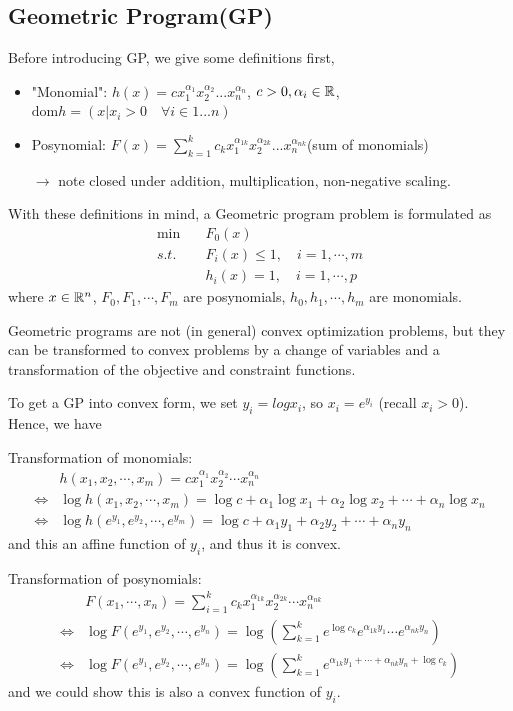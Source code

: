 \subsection{Geometric Program(GP)}
Before introducing GP, we give some definitions first,
\begin{itemize}
	\item "Monomial": $h(x) = cx_1^{\alpha_1}x_2^{\alpha_2}...x_n^{\alpha_n}$, $c>0, \alpha_i\in \mathbb{R}$, $\text{dom} h = (x\vert x_i>0 \quad \forall i\in {1...n})$
	
	\item Posynomial: $F(x) = \sum^k_{k=1}c_kx_1^{\alpha_{1k}}x_2^{\alpha_{2k}}...x_n^{\alpha_{nk}}$(sum of monomials)
	
	$\rightarrow$ note closed under addition, multiplication, non-negative scaling.
\end{itemize}

With these definitions in mind, a Geometric program problem is formulated as 
\begin{align*}
\min\quad &F_0(x)\\
s.t. \quad&F_i(x)\leq 1,\quad i = 1,\cdots,m\\
&h_i(x)= 1,\quad i = 1,\cdots,p
\end{align*}
where $x\in\mathbb{R}^{n}$, $F_0, F_1,\cdots,F_m$ are posynomials, $h_0, h_1,\cdots,h_m$ are monomials. 


Geometric programs are not (in general) convex optimization problems, but they can be transformed to convex problems by a change of variables and a transformation of the objective and constraint functions.

To get a GP into convex form, we set $y_i = log x_i$, so $x_i = e^{y_i}$ (recall $x_i > 0$). Hence, we have

Transformation of monomials:
\begin{align*}
&h(x_1,x_2,\cdots,x_m) = cx_1^{\alpha_1}x_2^{\alpha_2}\cdots x_n^{\alpha_n}\\
\Leftrightarrow& \log h(x_1,x_2,\cdots,x_m) = \log c + \alpha_1 \log x_1 +\alpha_2 \log x_2 + \cdots + \alpha_n \log x_n\\
\Leftrightarrow& \log h(e^{y_1},e^{y_2},\cdots,e^{y_m}) = \log c + \alpha_1 y_1 +\alpha_2 y_2 + \cdots + \alpha_n y_n
\end{align*}
and this an affine function of $y_i$, and thus it is convex.

Transformation of posynomials:
\begin{align*}
&F(x_1,\cdots,x_n) = \sum^k_{i=1}c_kx_1^{\alpha_{1k}}x_2^{\alpha_{2k}}\cdots x_n^{\alpha_{nk}}\\
\Leftrightarrow& \log F(e^{y_1},e^{y_2},\cdots,e^{y_n}) = \log(\sum^k_{k=1}e^{\log c_k}e^{\alpha_{1k}y_1}\cdots e^{\alpha_{nk}y_n})\\
\Leftrightarrow& \log F(e^{y_1},e^{y_2},\cdots,e^{y_n})             =\log(\sum^k_{k=1}e^{\alpha_{1k}y_1+\cdots+\alpha_{nk}y_n+\log c_k})
\end{align*}
and we could show this is also a convex function of $y_i$.

